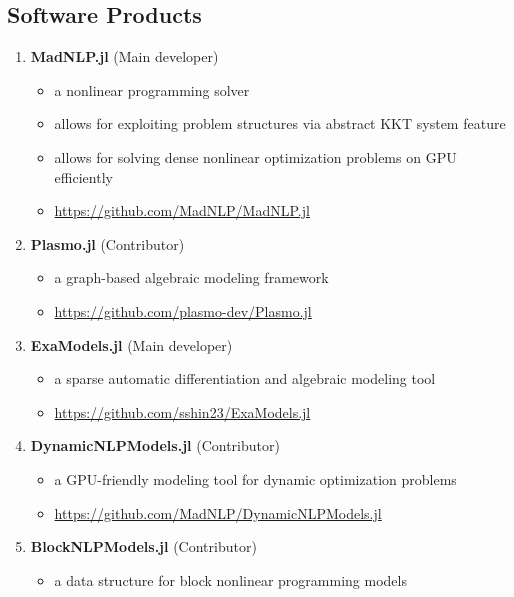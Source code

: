 \documentclass[letterpaper, 11pt]{article}
\begin{document}
\subsection*{Software Products}
\begin{enumerate}[itemsep=0pt]
\renewcommand*{\labelenumi}{[S\theenumi]}
\item {\bf MadNLP.jl} (Main developer)
  \begin{itemize}[leftmargin=*,topsep=0pt,label=$\bullet$,topsep=-5pt,itemsep=-1pt]
  \item a nonlinear programming solver
  \item allows for exploiting problem structures via abstract KKT system feature
  \item allows for solving dense nonlinear optimization problems on GPU efficiently
  \item \url{https://github.com/MadNLP/MadNLP.jl}
\end{itemize}
\item {\bf Plasmo.jl} (Contributor)
  \begin{itemize}[leftmargin=*,topsep=0pt,label=$\bullet$,topsep=-5pt,itemsep=-1pt]
  \item a graph-based algebraic modeling framework
  \item \url{https://github.com/plasmo-dev/Plasmo.jl}
  \end{itemize}
\item {\bf ExaModels.jl} (Main developer)
  \begin{itemize}[leftmargin=*,topsep=0pt,label=$\bullet$,topsep=-5pt,itemsep=-1pt]
  \item a sparse automatic differentiation and algebraic modeling tool
  \item \url{https://github.com/sshin23/ExaModels.jl}
  \end{itemize}
\item {\bf DynamicNLPModels.jl} (Contributor)
  \begin{itemize}[leftmargin=*,topsep=0pt,label=$\bullet$,topsep=-5pt,itemsep=-1pt]
  \item a GPU-friendly modeling tool for dynamic optimization problems
  \item \url{https://github.com/MadNLP/DynamicNLPModels.jl}
  \end{itemize}
\item {\bf BlockNLPModels.jl} (Contributor)
  \begin{itemize}[leftmargin=*,topsep=0pt,label=$\bullet$,topsep=-5pt,itemsep=-1pt]
  \item a data structure for block nonlinear programming models

\end{itemize}
\end{enumerate}
\end{document}
